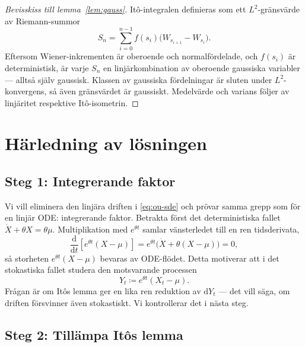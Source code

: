 \documentclass[11pt,a4paper]{article}
\newcommand{\dd}{\mathrm{d}}
\theoremstyle{plain}
\theoremstyle{definition}
\theoremstyle{remark}
\begin{document}
\begin{proof}[Bevisskiss till lemma~\ref{lem:gauss}]
Itô-integralen definieras som ett $L^2$-gränsvärde av Riemann-summor
\[
    S_n = \sum_{i=0}^{n-1} f(s_i)\bigl(W_{s_{i+1}} - W_{s_i}\bigr).
\]
Eftersom Wiener-inkrementen är oberoende och normalfördelade, och $f(s_i)$ är deterministisk, är varje $S_n$ en linjärkombination av oberoende gaussiska variabler --- alltså själv gaussisk. Klassen av gaussiska fördelningar är sluten under $L^2$-konvergens, så även gränsvärdet är gaussiskt. Medelvärde och varians följer av linjäritet respektive Itô-isometrin.
\end{proof}

\section{Härledning av lösningen}

\subsection*{Steg 1: Integrerande faktor}

Vi vill eliminera den linjära driften i \eqref{eq:ou-sde} och prövar samma grepp som för en linjär ODE: integrerande faktor. Betrakta först det deterministiska fallet $\dot X + \theta X = \theta\mu$. Multiplikation med $e^{\theta t}$ samlar vänsterledet till en ren tidsderivata,
\[
    \frac{\dd}{\dd t}\!\left[e^{\theta t}(X - \mu)\right]
    = e^{\theta t}\bigl(\dot X + \theta(X - \mu)\bigr) = 0,
\]
så storheten $e^{\theta t}(X - \mu)$ bevaras av ODE-flödet. Detta motiverar att i det stokastiska fallet studera den motsvarande processen
\begin{equation}
    Y_t \coloneqq e^{\theta t}(X_t - \mu).
    \label{eq:Y-def}
\end{equation}
Frågan är om Itôs lemma ger en lika ren reduktion av $\dd Y_t$ --- det vill säga, om driften försvinner även stokastiskt. Vi kontrollerar det i nästa steg.

\subsection*{Steg 2: Tillämpa Itôs lemma}
\end{document}
